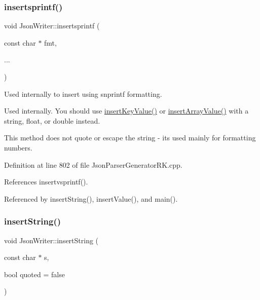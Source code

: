 \mbox{\label{class_json_writer_a8a584941a871018cd09315276b8bf7ca}} 
\subsubsection{\texorpdfstring{insertsprintf()}{insertsprintf()}}
{\footnotesize\ttfamily void Json\+Writer\+::insertsprintf (\begin{DoxyParamCaption}\item[{const char $\ast$}]{fmt,  }\item[{}]{... }\end{DoxyParamCaption})}



Used internally to insert using snprintf formatting. 

Used internally. You should use \hyperlink{class_json_writer_ac2de627389b59ce2c8ed95e10ea213bf}{insert\+Key\+Value()} or \hyperlink{class_json_writer_a8b4dc6726b66b4f277c7674e60c8a057}{insert\+Array\+Value()} with a string, float, or double instead.

This method does not quote or escape the string -\/ it\textquotesingle{}s used mainly for formatting numbers. 

Definition at line 802 of file Json\+Parser\+Generator\+R\+K.\+cpp.



References insertvsprintf().



Referenced by insert\+String(), insert\+Value(), and main().

\mbox{\label{class_json_writer_acf5ad9145b651c78873a71abbe372c9b}} 
\subsubsection{\texorpdfstring{insert\+String()}{insertString()}}
{\footnotesize\ttfamily void Json\+Writer\+::insert\+String (\begin{DoxyParamCaption}\item[{const char $\ast$}]{s,  }\item[{bool}]{quoted = {\ttfamily false} }\end{DoxyParamCaption})}



